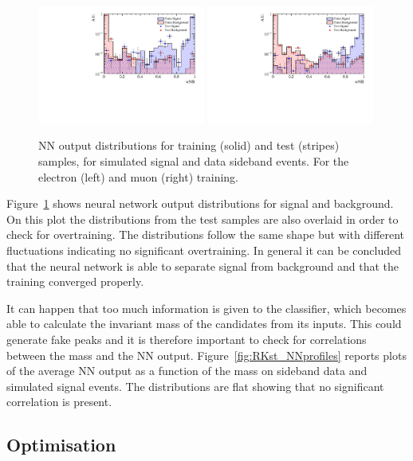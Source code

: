 \begin{figure}
\centering
\includegraphics[width=0.49\textwidth]{RKst/figs/Training/EE_wNB_TrainAndTest.pdf}
\includegraphics[width=0.49\textwidth]{RKst/figs/Training/MM_wNB_TrainAndTest.pdf}
\caption{NN output distributions for training (solid) and test (stripes) samples, for simulated 
signal and data sideband events. For the electron (left) and muon (right) training.}
\label{fig:RKst_nnDist}
\end{figure}

Figure~\ref{fig:RKst_nnDist} shows neural network output distributions for signal and background.
On this plot the distributions from the test samples are also overlaid in order to check for overtraining. 
The distributions follow the same shape but with different fluctuations indicating no
significant overtraining. In general it can be concluded that the neural network is able to separate signal
from background and that the training converged properly.

It can happen that too much information is given to the classifier, which becomes able to 
calculate the invariant mass of the candidates from its inputs. This could generate fake peaks and it is therefore
important to check for correlations between the \Bz mass and the NN output. Figure~\ref{fig:RKst_NNprofiles} reports
plots of the average NN output as a function of the \Bz mass on sideband data and simulated signal events.
The distributions are flat showing that no significant correlation is present.


\subsection{Optimisation}
\label{sec:optimisation}

